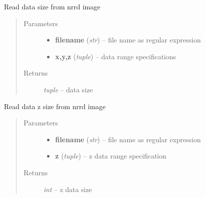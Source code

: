 \documentclass[letterpaper,10pt,english]{sphinxmanual}
\begin{document}

\begin{fulllineitems}
\label{api/ClearMap.IO:ClearMap.IO.NRRD.dataSize}
Read data size from nrrd image
\begin{quote}\begin{description}
\item[{Parameters}] \leavevmode\begin{itemize}
\item {} 
\textbf{filename} (\emph{str}) --
file name as regular expression

\item {} 
\textbf{x,y,z} (\emph{tuple}) --
data range specifications

\end{itemize}

\item[{Returns}] \leavevmode
\emph{tuple} --
data size

\end{description}\end{quote}

\end{fulllineitems}


\begin{fulllineitems}
\label{api/ClearMap.IO:ClearMap.IO.NRRD.dataZSize}
Read data z size from nrrd image
\begin{quote}\begin{description}
\item[{Parameters}] \leavevmode\begin{itemize}
\item {} 
\textbf{filename} (\emph{str}) --
file name as regular expression

\item {} 
\textbf{z} (\emph{tuple}) --
z data range specification

\end{itemize}

\item[{Returns}] \leavevmode
\emph{int} --
z data size

\end{description}\end{quote}

\end{fulllineitems}
\end{document}
